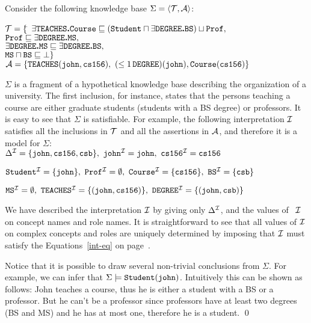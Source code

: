 \begin{example} Consider the following knowledge base
$\Sigma=\langle{\cal T},{\cal A}\rangle$:

\begin{tabbing}
\indent
${\cal T} = \{$\= $\exists \tt TEACHES \mbox{\bf .} \tt Course  \sqsubseteq
    ({\tt Student}\sqcap\exists {\tt DEGREE} \mbox{\bf .} {\tt BS})\sqcup {\tt Prof},$ \+\\
${\tt Prof } \sqsubseteq  \exists \tt DEGREE \mbox{\bf .} \tt MS,$ \\
$\exists {\tt DEGREE} \mbox{\bf .} {\tt MS}  \sqsubseteq   \exists {\tt DEGREE} \mbox{\bf .} {\tt BS},$ \\
${\tt MS} \sqcap {\tt BS} \sqsubseteq \bot\}$\-\\

\indent
${\cal A} = \{
{\tt TEACHES(john,cs156)},~(\leq 1 \, {\tt DEGREE})({\tt john}),
{\tt Course(cs156)} \}$
\end{tabbing}

\noindent
$\Sigma$ is a fragment of a hypothetical knowledge base describing the organization of a university.
The first inclusion, for instance, states that the persons teaching a course are either
graduate students (students with a BS degree) or professors.
It is easy to see that $\Sigma$ is satisfiable. For example, the following
interpretation ${\cal I}$ satisfies all the inclusions in ${\cal T}$ and all the assertions in ${\cal A}$, 
and therefore it is a model for $\Sigma$:\\[1.3ex]
\indent
$\Delta^{\cal I} = \{{\tt john},{\tt cs156},{\tt csb}\},
~\tt john^{\cal I}={\tt john},~\tt cs156^{\cal I} = {\tt cs156}$

$\tt Student^{\cal I}=\{{\tt john}\},~
\tt Prof^{\cal I}	= \emptyset,~
\tt Course^{\cal I}= \{{\tt cs156}\},~
\tt BS^{\cal I}	= \{{\tt csb}\}$

$\tt MS^{\cal I}	= \emptyset,~
\tt TEACHES^{\cal I}= \{({\tt john},{\tt cs156})\},~
\tt DEGREE^{\cal I}= \{({\tt john},{\tt csb})\}$\\[1.3ex]
%
\noindent

We have described the interpretation ${\cal I}$ by giving only $\Delta^{\cal I}$, and the
values of~ ${\cal I}$ on concept names and role names. It is straightforward
to see that all values of ${\cal I}$ on complex concepts and roles are uniquely
determined by imposing that ${\cal I}$ must satisfy the Equations~\ref{int-eq}
on page~\pageref{int-eq}.

Notice that it is possible to draw several non-trivial 
conclusions from $\Sigma$. 
For example, we can infer that $\Sigma\models {\tt Student(john)}$. 
Intuitively this can be shown as follows: John teaches a course, thus he
is either a student with a BS or a professor. But
he can't be a professor since professors have at 
least two degrees (BS and MS) and he has at most one,  
therefore he is a student. \qed
\end{example}

